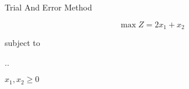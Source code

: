 \begin{frameExample}{Trial And Error Method  \label{example:2-9-3_Gupta-ebook}}{}

  \[     \max Z = 2x_1 + x_2 \]

  {\centering
    subject to

    \sysdelim..%

    \vspace{5mm}
    $    x_1, x_2  \geq 0$
    \par}


\end{frameExample}

